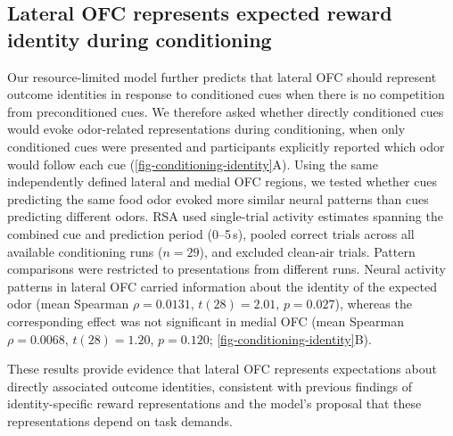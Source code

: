 \documentclass[12pt,letterpaper]{article}
\begin{document}
\label{fig-identity-simu}

\par\endgroup\bigskip





\subsection*{Lateral OFC represents expected reward identity during conditioning}
\label{subsec-conditioning-identity}

Our resource-limited model further predicts that lateral OFC should represent outcome identities in response to conditioned cues when there is no competition from preconditioned cues. We therefore asked whether directly conditioned cues would evoke odor-related representations during conditioning, when only conditioned cues were presented and participants explicitly reported which odor would follow each cue (\autoref{fig-conditioning-identity}A). Using the same independently defined lateral and medial OFC regions, we tested whether cues predicting the same food odor evoked more similar neural patterns than cues predicting different odors. RSA used single-trial activity estimates spanning the combined cue and prediction period (0--5\,s), pooled correct trials across all available conditioning runs ($n = 29$), and excluded clean-air trials. Pattern comparisons were restricted to presentations from different runs. Neural activity patterns in lateral OFC carried information about the identity of the expected odor (mean Spearman $\rho = 0.0131$, $t(28) = 2.01$, $p = 0.027$), whereas the corresponding effect was not significant in medial OFC (mean Spearman $\rho = 0.0068$, $t(28) = 1.20$, $p = 0.120$; \autoref{fig-conditioning-identity}B).

These results provide evidence that lateral OFC represents expectations about directly associated outcome identities, consistent with previous findings of identity-specific reward representations \citep{howard2015identity,howard2017identity,liuyaoatt24,witkowski2026identity} and the model's proposal that these representations depend on task demands.


\par\bigskip\begingroup
{}
\end{document}

